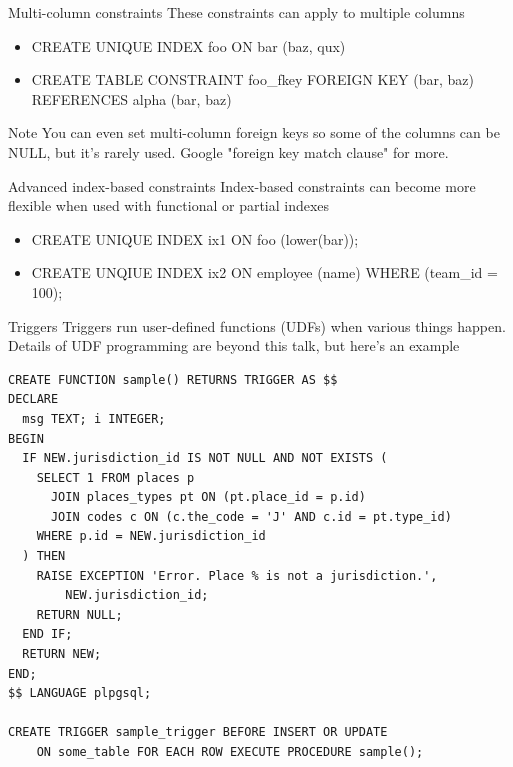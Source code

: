 \documentclass{beamer}
\begin{document}
\begin{frame}{Multi-column constraints}
    These constraints can apply to multiple columns
    \begin{itemize}
        \item CREATE UNIQUE INDEX foo ON bar (baz, qux)
        \item CREATE TABLE CONSTRAINT foo\_fkey FOREIGN KEY (bar, baz) REFERENCES alpha (bar, baz)
    \end{itemize}
    \vspace{0.1\textheight}
    \begin{block}{Note}
        You can even set multi-column foreign keys so some of the columns can be NULL, but it's rarely used. Google "foreign key match clause" for more.
    \end{block}
\end{frame}

\begin{frame}{Advanced index-based constraints}
    Index-based constraints can become more flexible when used with functional or partial indexes
    \begin{itemize}
        \item CREATE UNIQUE INDEX ix1 ON foo (lower(bar));
        \item CREATE UNQIUE INDEX ix2 ON employee (name) WHERE (team\_id = 100);
    \end{itemize}
\end{frame}

\begin{frame}{Triggers}
    Triggers run user-defined functions (UDFs) when various things happen. Details of UDF programming are beyond this talk, but here's an example
\end{frame}

\begin{frame}[fragile]
    \footnotesize
    \begin{Verbatim}[fontfamily=courier]
CREATE FUNCTION sample() RETURNS TRIGGER AS $$
DECLARE
  msg TEXT; i INTEGER;
BEGIN
  IF NEW.jurisdiction_id IS NOT NULL AND NOT EXISTS (
    SELECT 1 FROM places p
      JOIN places_types pt ON (pt.place_id = p.id)
      JOIN codes c ON (c.the_code = 'J' AND c.id = pt.type_id)
    WHERE p.id = NEW.jurisdiction_id
  ) THEN
    RAISE EXCEPTION 'Error. Place % is not a jurisdiction.',
        NEW.jurisdiction_id;
    RETURN NULL;
  END IF;
  RETURN NEW;
END;
$$ LANGUAGE plpgsql;

CREATE TRIGGER sample_trigger BEFORE INSERT OR UPDATE
    ON some_table FOR EACH ROW EXECUTE PROCEDURE sample();
    \end{Verbatim}
\end{frame}
\end{document}
